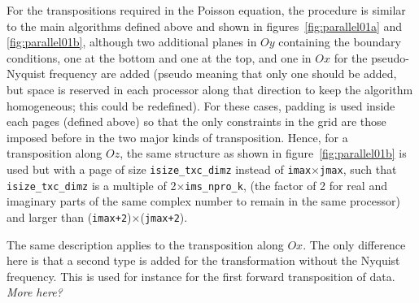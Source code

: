 For the transpositions required in the Poisson equation, the procedure is
similar to the main algorithms defined above and shown in
figures~\ref{fig:parallel01a} and \ref{fig:parallel01b}, although two additional
planes in $Oy$ containing the boundary conditions, one at the bottom and one at
the top, and one in $Ox$ for the pseudo-Nyquist frequency are added (pseudo
meaning that only one should be added, but space is reserved in each processor
along that direction to keep the algorithm homogeneous; this could be
redefined). For these cases, padding is used inside each pages (defined above)
so that the only constraints in the grid are those imposed before in the two
major kinds of transposition. Hence, for a transposition along $Oz$, the same
structure as shown in figure~\ref{fig:parallel01b} is used but with a page of
size {\tt isize\_txc\_dimz} instead of {\tt imax}$\times${\tt jmax}, such that
{\tt isize\_txc\_dimz} is a multiple of 2$\times${\tt ims\_npro\_k}, (the factor
of 2 for real and imaginary parts of the same complex number to remain in the
same processor) and larger than ({\tt imax+2})$\times$({\tt jmax+2}). 

The same description applies to the transposition along $Ox$. The only
difference here is that a second type is added for the transformation without
the Nyquist frequency. This is used for instance for the first forward
transposition of data. {\em More here?}
